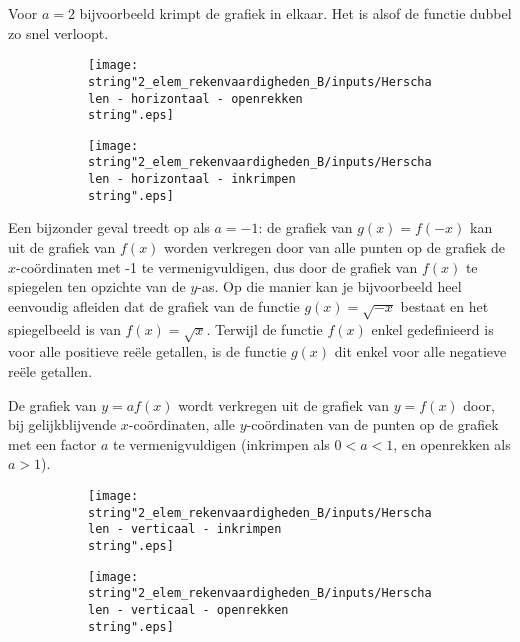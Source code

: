 Voor $a=2$ bijvoorbeeld krimpt de grafiek in elkaar. Het
is alsof de functie dubbel zo snel verloopt.

\begin{figure}[h]
\begin{subfigure}{.5\linewidth}
\texttt{[image: \\string"2\_elem\_rekenvaardigheden\_B/inputs/Herschalen - horizontaal - openrekken\\string".eps]}
\end{subfigure}
\begin{subfigure}{.5\linewidth}
\texttt{[image: \\string"2\_elem\_rekenvaardigheden\_B/inputs/Herschalen - horizontaal - inkrimpen\\string".eps]}
\end{subfigure}	
\end{figure}

Een bijzonder geval treedt op als $a=-1$: de grafiek van
$g(x)=f(-x)$ kan uit de grafiek van $f(x)$ worden verkregen door
van alle punten op de grafiek de $x$-co\"ordinaten met -1 te vermenigvuldigen,
dus door de grafiek van $f(x)$ te spiegelen ten opzichte van de $y$-as.
Op die manier kan je bijvoorbeeld heel eenvoudig afleiden dat de grafiek
van de functie $g(x)=\sqrt{-x}$ bestaat en het spiegelbeeld is van
$f(x)=\sqrt{x}$. Terwijl de functie $f(x)$ enkel gedefinieerd is
voor alle positieve re\"ele getallen, is de functie $g(x)$ dit enkel
voor alle negatieve re\"ele getallen.


De grafiek van $y=af(x)$ wordt verkregen uit de grafiek
van $y=f(x)$ door, bij gelijkblijvende $x$-co\"ordinaten, alle $y$-co\"ordinaten
van de punten op de grafiek met een factor $a$ te vermenigvuldigen
(inkrimpen als $0<a<1$, en openrekken als $a>1$).


\begin{figure}[h]
	\begin{subfigure}{.5\linewidth}
	\texttt{[image: \\string"2\_elem\_rekenvaardigheden\_B/inputs/Herschalen - verticaal - inkrimpen\\string".eps]}
	\end{subfigure}
	\begin{subfigure}{.5\linewidth}
	\texttt{[image: \\string"2\_elem\_rekenvaardigheden\_B/inputs/Herschalen - verticaal - openrekken\\string".eps]}
	\end{subfigure}	
\end{figure}

